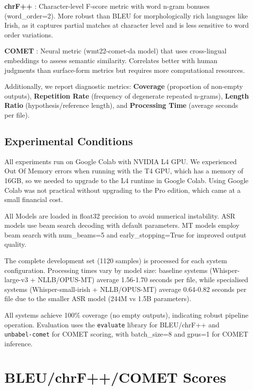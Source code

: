 \documentclass[11pt]{article}
\begin{document}
\textbf{chrF++} \citep{popovic2015chrf}: Character-level F-score metric with word n-gram bonuses (word\_order=2). More robust than BLEU for morphologically rich languages like Irish, as it captures partial matches at character level and is less sensitive to word order variations.

\textbf{COMET} \citep{rei2020comet}: Neural metric (wmt22-comet-da model) that uses cross-lingual embeddings to assess semantic similarity. Correlates better with human judgments than surface-form metrics but requires more computational resources.

Additionally, we report diagnostic metrics: \textbf{Coverage} (proportion of non-empty outputs), \textbf{Repetition Rate} (frequency of degenerate repeated n-grams), \textbf{Length Ratio} (hypothesis/reference length), and \textbf{Processing Time} (average seconds per file).

\subsection{Experimental Conditions}

All experiments run on Google Colab with NVIDIA L4 GPU. We experienced Out Of Memory errors when running with the T4 GPU, which has a memory of 16GB, so we needed to upgrade to the L4 runtime in Google Colab. Using Google Colab was not practical without upgrading to the Pro edition, which came at a small financial cost.

All Models are loaded in float32 precision to avoid numerical instability. ASR models use beam search decoding with default parameters. MT models employ beam search with num\_beams=5 and early\_stopping=True for improved output quality.

The complete development set (1120 samples) is processed for each system configuration. Processing times vary by model size: baseline systems (Whisper-large-v3 + NLLB/OPUS-MT) average 1.56-1.70 seconds per file, while specialised systems (Whisper-small-irish + NLLB/OPUS-MT) average 0.64-0.82 seconds per file due to the smaller ASR model (244M vs 1.5B parameters).

All systems achieve 100\% coverage (no empty outputs), indicating robust pipeline operation. Evaluation uses the \texttt{evaluate} library for BLEU/chrF++ and \texttt{unbabel-comet} for COMET scoring, with batch\_size=8 and gpus=1 for COMET inference.

\section{BLEU/chrF++/COMET Scores}
\end{document}
